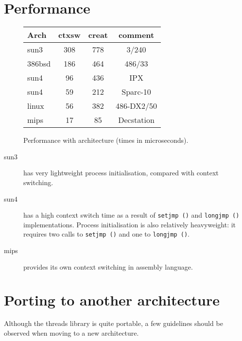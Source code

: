 \section{Performance}
\begin{figure}[htb]
\begin{center}
\begin{tabular}{||l|c|c|c||} \hline
Arch	& ctxsw	& creat & comment \\ \hline
sun3 	& 308 	& 778	& 3/240 \\ \hline
386bsd 	& 186 	& 464 	& 486/33 \\ \hline
sun4 	& 96 	& 436 	& IPX \\ \hline
sun4	& 59	& 212 	& Sparc-10 \\ \hline
linux	& 56	& 382	& 486-DX2/50 \\ \hline
mips 	& 17 	& 85 	& Decstation \\ \hline
\end{tabular}
\caption{Performance with architecture (times in microseconds).}
\end{center}
\end{figure}
\begin{description}
\item[sun3] has very lightweight process initialisation, compared with
context switching.
\item[sun4] has a high context switch time as a result of {\tt setjmp ()} and
{\tt longjmp ()} implementations.  Process initialisation is also relatively
heavyweight: it requires two calls to {\tt setjmp ()} and one to {\tt longjmp
()}.
\item[mips] provides its own context switching in assembly language.
\end{description}

\section{Porting to another architecture}
Although the threads library is quite portable, a few guidelines should
be observed when moving to a new architecture.


